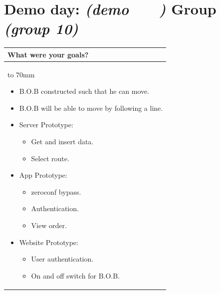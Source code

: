 \documentclass[a4paper]{article}
\newcommand{\colWidth}{141mm}
\begin{document}
 
\section*{Demo day: \textit{(demo   \  \  \  )} Group \textit{(group 10)}}


\begin{center}
\begin{tabular}{|p{\colWidth}|}
	\hline
	\cellcolor{blue!25}\large
	\textbf{What were your goals?}
	\\ \hline
	\vtop to 70mm{
\begin{itemize}
    \item B.O.B constructed such that he can move.
    \item B.O.B will be able to move by following a line.
    \item Server Prototype: 
    \begin{itemize}
        \item Get and insert data.
        \item Select route.
    \end{itemize}
    \item App Prototype:
    \begin{itemize}
        \item zeroconf bypass.
        \item Authentication.
        \item View order.
    \end{itemize}
    \item Website Prototype: 
    \begin{itemize}
        \item User authentication.
        \item On and off switch for B.O.B.
    \end{itemize}
\end{itemize}
  }
  \\
  \hline
\end{tabular}
\vskip 5mm



\end{center}
\end{document}
